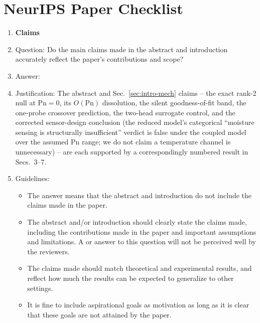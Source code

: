 \section*{NeurIPS Paper Checklist}




\begin{enumerate}

\item {\bf Claims}
    \item[] Question: Do the main claims made in the abstract and introduction accurately reflect the paper's contributions and scope?
    \item[] Answer: \answerYes{} %
    \item[] Justification: The abstract and Sec.~\ref{sec:intro-mech} claims -- the exact rank-2 null at $\mathrm{Pn}{=}0$, its $O(\mathrm{Pn})$ dissolution, the silent goodness-of-fit band, the one-probe crossover prediction, the two-head surrogate control, and the corrected sensor-design conclusion (the reduced model's categorical ``moisture sensing is structurally insufficient'' verdict is false under the coupled model over the assumed $\mathrm{Pn}$ range; we do not claim a temperature channel is unnecessary) -- are each supported by a correspondingly numbered result in Secs.~3--7.
    \item[] Guidelines:
    \begin{itemize}
        \item The answer \answerNA{} means that the abstract and introduction do not include the claims made in the paper.
        \item The abstract and/or introduction should clearly state the claims made, including the contributions made in the paper and important assumptions and limitations. A \answerNo{} or \answerNA{} answer to this question will not be perceived well by the reviewers. 
        \item The claims made should match theoretical and experimental results, and reflect how much the results can be expected to generalize to other settings. 
        \item It is fine to include aspirational goals as motivation as long as it is clear that these goals are not attained by the paper. 
    \end{itemize}


\end{enumerate}
